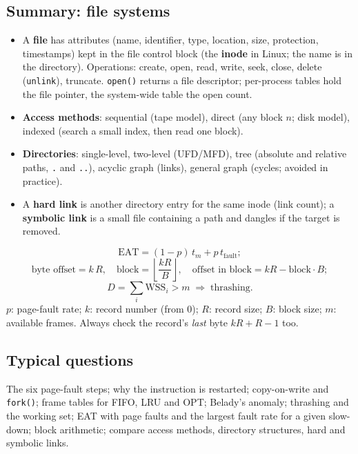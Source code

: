 \documentclass[11pt,a4paper]{article}
\newcommand{\term}[1]{\textbf{\color{mintdeep}#1}}
\newcommand{\cmd}[1]{\texttt{#1}}
\begin{document}
\subsection*{Summary: file systems}
\begin{itemize}
  \item A \term{file} has attributes (name, identifier, type, location, size, protection, timestamps) kept in the file control block (the \term{inode} in Linux; the name is in the directory). Operations: create, open, read, write, seek, close, delete (\cmd{unlink}), truncate. \cmd{open()} returns a file descriptor; per-process tables hold the file pointer, the system-wide table the open count.
  \item \textbf{Access methods}: sequential (tape model), direct (any block $n$; disk model), indexed (search a small index, then read one block).
  \item \textbf{Directories}: single-level, two-level (UFD/MFD), tree (absolute and relative paths, \texttt{.} and \texttt{..}), acyclic graph (links), general graph (cycles; avoided in practice).
  \item A \term{hard link} is another directory entry for the same inode (link count); a \term{symbolic link} is a small file containing a path and dangles if the target is removed.
\end{itemize}

\begin{keyidea}
\[
\text{EAT} = (1-p)\,t_m + p\,t_{\text{fault}};
\]
\[
\text{byte offset} = k\,R, \quad \text{block} = \left\lfloor \frac{kR}{B} \right\rfloor, \quad \text{offset in block} = kR - \text{block}\cdot B;
\]
\[
D = \sum_i \text{WSS}_i > m \;\Rightarrow\; \text{thrashing}.
\]
$p$: page-fault rate; $k$: record number (from $0$); $R$: record size; $B$: block size; $m$: available frames. Always check the record's \emph{last} byte $kR + R - 1$ too.
\end{keyidea}

\subsection*{Typical questions}
The six page-fault steps; why the instruction is restarted; copy-on-write and \cmd{fork()}; frame tables for FIFO, LRU and OPT; Belady's anomaly; thrashing and the working set; EAT with page faults and the largest fault rate for a given slow-down; block arithmetic; compare access methods, directory structures, hard and symbolic links.
\end{document}
